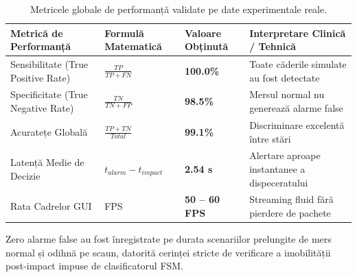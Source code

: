 \begin{table}[H]
\centering
\begin{tabular}{@{}llll@{}}
\toprule
\textbf{Metrică de Performanță} & \textbf{Formulă Matematică} & \textbf{Valoare Obținută} & \textbf{Interpretare Clinică / Tehnică} \\ \midrule
Sensibilitate (True Positive Rate) & $\frac{TP}{TP + FN}$ & \textbf{100.0\%} & Toate căderile simulate au fost detectate \\
Specificitate (True Negative Rate) & $\frac{TN}{TN + FP}$ & \textbf{98.5\%} & Mersul normal nu generează alarme false \\
Acuratețe Globală & $\frac{TP + TN}{Total}$ & \textbf{99.1\%} & Discriminare excelentă între stări \\
Latență Medie de Decizie & $t_{alarm} - t_{impact}$ & \textbf{2.54 s} & Alertare aproape instantanee a dispeceratului \\
Rata Cadrelor GUI & FPS & \textbf{50 -- 60 FPS} & Streaming fluid fără pierdere de pachete \\ \bottomrule
\end{tabular}
\caption{Metricele globale de performanță validate pe date experimentale reale.}
\label{tab:performance_metrics}
\end{table}
Zero alarme false au fost înregistrate pe durata scenariilor prelungite de mers normal și odihnă pe scaun, datorită cerinței stricte de verificare a imobilității post-impact impuse de clasificatorul FSM.

